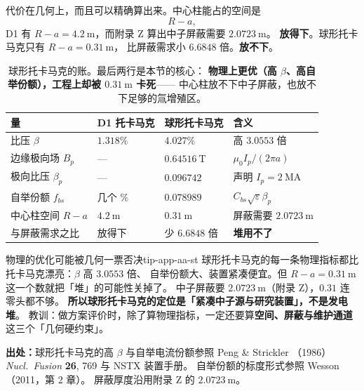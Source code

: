 代价在几何上，而且可以精确算出来。中心柱能占的空间是
\begin{equation}
R - a,
\label{eq:app-aa-space}
\end{equation}
D1 有 $R-a = 4.2\ \mathrm{m}$，而附录 Z 算出中子屏蔽需要 $2.0723\ \mathrm{m}$。
\textbf{放得下}。球形托卡马克只有 $R-a = 0.31\ \mathrm{m}$，
比屏蔽需求小 $6.6848$ 倍。\textbf{放不下}。

\begin{table}[htbp]
\centering
\small
\caption{球形托卡马克的账。最后两行是本节的核心：
\textbf{物理上更优（高 $\beta$、高自举份额），工程上却被 $0.31\ \mathrm{m}$ 卡死}——
中心柱放不下中子屏蔽，也放不下足够的氚增殖区。}
\label{tab:app-aa-st}
\begin{tabular}{p{3.6cm}p{3.0cm}p{3.0cm}p{3.2cm}}
\toprule
量 & D1 托卡马克 & 球形托卡马克 & 含义 \\
\midrule
比压 $\beta$ & $1.318\%$ & $4.027\%$ & 高 $3.0553$ 倍 \\
边缘极向场 $B_p$ & --- & $0.64516\ \mathrm{T}$ & $\mu_0I_p/(2\pi a)$ \\
极向比压 $\beta_p$ & --- & $0.096742$ & 声明 $I_p = 2\ \mathrm{MA}$ \\
自举份额 $f_{bs}$ & 几个 $\%$ & $0.078989$ & $C_{bs}\sqrt{\varepsilon}\beta_p$ \\
中心柱空间 $R-a$ & $4.2\ \mathrm{m}$ & $0.31\ \mathrm{m}$ & 屏蔽需要 $2.0723\ \mathrm{m}$ \\
与屏蔽需求之比 & 放得下 & 少 $6.6848$ 倍 & \textbf{堆用不了} \\
\bottomrule
\end{tabular}

\end{table}

\begin{tip}{物理的优化可能被几何一票否决}{tip-app-aa-st}
球形托卡马克的每一条物理指标都比托卡马克漂亮：$\beta$ 高 $3.0553$ 倍、
自举份额大、装置紧凑便宜。但 $R-a = 0.31\ \mathrm{m}$ 这一个数就把「堆」的可能性关掉了。
中子屏蔽要 $2.0723\ \mathrm{m}$（附录 Z），$0.31$ 连零头都不够。
\textbf{所以球形托卡马克的定位是「紧凑中子源与研究装置」，不是发电堆}。
教训：做方案评价时，除了算物理指标，一定还要算\textbf{空间、屏蔽与维护通道}这三个「几何硬约束」。
\end{tip}

{\footnotesize
\textbf{出处：}球形托卡马克的高 $\beta$ 与自举电流份额参照 Peng \& Strickler
（1986）\emph{Nucl.\ Fusion} \textbf{26}, 769 与 NSTX 装置手册。
自举份额的标度形式参照 Wesson（2011，第 2 章）。
屏蔽厚度沿用附录 Z 的 $2.0723\ \mathrm{m}$。
}

